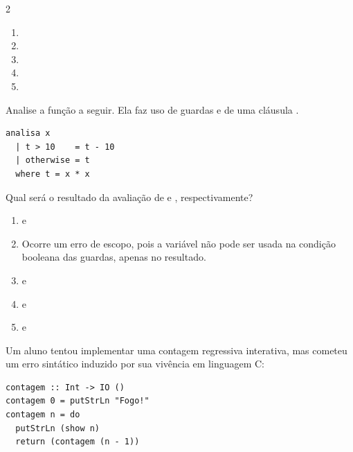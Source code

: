 \documentclass[a4paper,10pt,brazil]{article}
\begin{document}
\begin{multicols}{2}
\begin{enumerate}
  \item {}

  \item {}

  \item {}

  \item {}

  \item {}

\end{enumerate}

Analise a função a seguir. Ela faz uso de guardas e de uma cláusula .

\begin{verbatim}
analisa x
  | t > 10    = t - 10
  | otherwise = t
  where t = x * x
\end{verbatim}

Qual será o resultado da avaliação de  e , respectivamente?

\begin{enumerate}
  \item {} e 

  \item Ocorre um erro de escopo, pois a variável  não pode ser usada na condição booleana das guardas, apenas no resultado.

  \item {} e 

  \item {} e 

  \item {} e 


\end{enumerate}

Um aluno tentou implementar uma contagem regressiva interativa, mas cometeu um erro sintático induzido por sua vivência em linguagem C:

\begin{verbatim}
contagem :: Int -> IO ()
contagem 0 = putStrLn "Fogo!"
contagem n = do
  putStrLn (show n)
  return (contagem (n - 1))
\end{verbatim}


\end{multicols}
\end{document}
